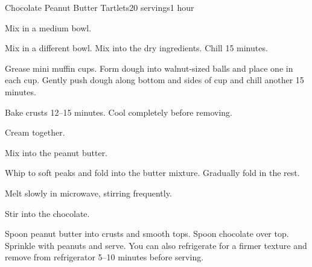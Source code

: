 \documentclass[../Cookbook.tex]{subfiles}
\begin{document}
\begin{recipe}{Chocolate Peanut Butter Tartlets}{20 servings}{1 hour}

Mix in a medium bowl.

Mix in a different bowl. Mix into the dry ingredients. Chill 15 minutes.

Grease mini muffin cups. Form dough into walnut-sized balls and place one in each cup. Gently push dough along bottom and sides of cup and chill another 15 minutes.

 Bake crusts 12--15 minutes. Cool completely before removing.

Cream together.

Mix into the peanut butter.

Whip to soft peaks and fold  into the butter mixture. Gradually fold in the rest.

Melt slowly in microwave, stirring frequently.

Stir into the chocolate.

Spoon peanut butter into crusts and smooth tops. Spoon chocolate over top. Sprinkle with peanuts and serve.
You can also refrigerate for a firmer texture and remove from refrigerator 5--10 minutes before serving.

\end{recipe}
\end{document}
